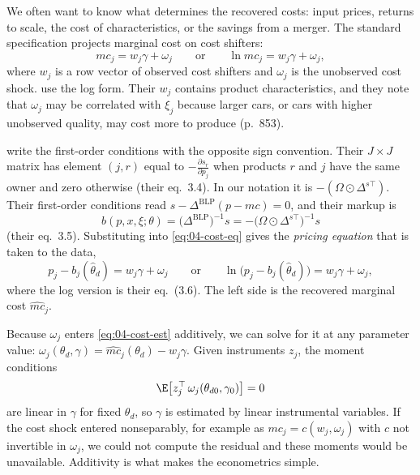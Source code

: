 We often want to know what determines the recovered costs: input prices, returns to scale, the cost of
characteristics, or the savings from a merger. The standard specification projects marginal cost on cost
shifters:
\begin{equation}\label{eq:04-cost-eq}
mc_j = w_j\gamma + \omega_j
\qquad\text{or}\qquad
\ln mc_j = w_j\gamma + \omega_j ,
\end{equation}
where $w_j$ is a row vector of observed cost shifters and $\omega_j$ is the unobserved cost shock.
\citet[eq.~(3.1)]{BerryLevinsohnPakes1995} use the log form. Their $w_j$ contains product characteristics, and they
note that $\omega_j$ may be correlated with $\xi_j$ because larger cars, or cars with higher unobserved quality,
may cost more to produce (p.~853).

\citet{BerryLevinsohnPakes1995} write the first-order conditions with the opposite sign convention. Their $J
\times J$ matrix has element $(j, r)$ equal to $-\frac{\partial s_r}{\partial p_j}$ when products $r$ and $j$ have
the same owner and zero otherwise (their eq.~3.4). In our notation it is $-(\Omega \odot \Delta^{s\top})$. Their
first-order conditions read $s - \Delta^{\mathrm{BLP}}(p - mc) = 0$, and their markup is
\begin{equation}\label{eq:04-blp-markup}
b(p, x, \xi; \theta) = \big(\Delta^{\mathrm{BLP}}\big)^{-1}s = -\big(\Omega \odot \Delta^{s\top}\big)^{-1}s
\end{equation}
(their eq.~3.5). Substituting into \eqref{eq:04-cost-eq} gives the \emph{pricing equation} that is taken to the
data,
\begin{equation}\label{eq:04-cost-est}
p_j - b_j(\hat\theta_d) = w_j\gamma + \omega_j
\qquad\text{or}\qquad
\ln\big(p_j - b_j(\hat\theta_d)\big) = w_j\gamma + \omega_j ,
\end{equation}
where the log version is their eq.~(3.6). The left side is the recovered marginal cost $\widehat{mc}_j$.

Because $\omega_j$ enters \eqref{eq:04-cost-est} additively, we can solve for it at any parameter value:
$\omega_j(\theta_d, \gamma) = \widehat{mc}_j(\theta_d) - w_j\gamma$. Given instruments $z_j$, the moment
conditions
\begin{equation}\label{eq:04-supply-moment}
\E\big[z_j^\top\,\omega_j(\theta_{d0}, \gamma_0)\big] = 0
\end{equation}
are linear in $\gamma$ for fixed $\theta_d$, so $\gamma$ is estimated by linear instrumental variables. If the
cost shock entered nonseparably, for example as $mc_j = c(w_j, \omega_j)$ with $c$ not invertible in $\omega_j$,
we could not compute the residual and these moments would be unavailable. Additivity is what makes the
econometrics simple.

